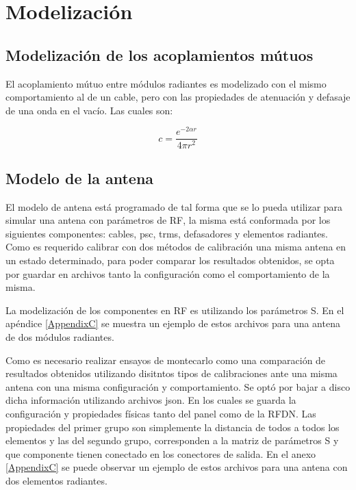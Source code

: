 \chapter{Modelización}
\label{ch:modelizacion}

\section{Modelización de los acoplamientos mútuos}

El acoplamiento mútuo entre módulos radiantes es modelizado con el mismo comportamiento al de un cable, pero con las 
propiedades de atenuación y defasaje de una onda en el vacío. Las cuales son:

\begin{equation}
	c = \dfrac{e^{-2\alpha r}}{4\pi r^2}
\end{equation}


\section{Modelo de la antena}

El modelo de antena está programado de tal forma que se lo pueda utilizar para simular una antena con parámetros de RF,
la misma está conformada por los siguientes componentes: cables, psc, trms, defasadores y elementos radiantes. Como es 
requerido calibrar con dos métodos de calibración una misma antena en un estado determinado, para poder comparar los resultados
obtenidos, se opta por guardar en archivos tanto la configuración como el comportamiento de la misma. 

La modelizaci\'on de los componentes en RF es utilizando los par\'ametros S. En el apéndice \ref{AppendixC} se muestra un 
ejemplo de estos archivos para una antena de dos módulos radiantes.

Como es necesario realizar ensayos de montecarlo como una comparación de resultados obtenidos utilizando disitntos tipos de 
calibraciones ante una misma antena con una misma configuración y comportamiento. Se optó por bajar a disco dicha información
utilizando archivos json. En los cuales se guarda la configuración y propiedades físicas tanto del panel como de la RFDN. Las
propiedades del primer grupo son simplemente la distancia de todos a todos los elementos y las del segundo grupo, corresponden
a la matriz de parámetros S y que componente tienen conectado en los conectores de salida. En el anexo \ref{AppendixC} se puede
observar un ejemplo de estos archivos para una antena con dos elementos radiantes.

